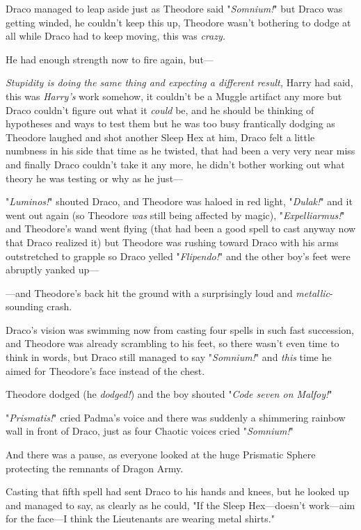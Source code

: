 Draco managed to leap aside just as Theodore said "\emph{Somnium!}" but Draco
was getting winded, he couldn't keep this up, Theodore wasn't bothering to
dodge at all while Draco had to keep moving, this was \emph{crazy.}

He had enough strength now to fire again, but—

\emph{Stupidity is doing the same thing and expecting a different result,}
Harry had said, this was \emph{Harry's} work somehow, it couldn't be a Muggle
artifact any more but Draco couldn't figure out what it \emph{could} be, and he
should be thinking of hypotheses and ways to test them but he was too busy
frantically dodging as Theodore laughed and shot another Sleep Hex at him,
Draco felt a little numbness in his side that time as he twisted, that had been
a very very near miss and finally Draco couldn't take it any more, he didn't
bother working out what theory he was testing or why as he just—

"\emph{Luminos!}" shouted Draco, and Theodore was haloed in red light,
"\emph{Dulak!}" and it went out again (so Theodore \emph{was} still being
affected by magic), "\emph{Expelliarmus!}" and Theodore's wand went flying
(that had been a good spell to cast anyway now that Draco realized it) but
Theodore was rushing toward Draco with his arms outstretched to grapple so
Draco yelled "\emph{Flipendo!}" and the other boy's feet were abruptly yanked
up—

—and Theodore's back hit the ground with a surprisingly loud and
\emph{metallic}-sounding crash.

Draco's vision was swimming now from casting four spells in such fast
succession, and Theodore was already scrambling to his feet, so there wasn't
even time to think in words, but Draco still managed to say "\emph{Somnium!}"
and \emph{this} time he aimed for Theodore's face instead of the chest.

Theodore dodged (he \emph{dodged!}) and the boy shouted "\emph{Code seven on
Malfoy!}"

"\emph{Prismatis!}" cried Padma's voice and there was suddenly a shimmering
rainbow wall in front of Draco, just as four Chaotic voices cried
"\emph{Somnium!}"

And there was a pause, as everyone looked at the huge Prismatic Sphere
protecting the remnants of Dragon Army.

Casting that fifth spell had sent Draco to his hands and knees, but he looked
up and managed to say, as clearly as he could, "If the Sleep Hex—doesn't
work—aim for the face—I think the Lieutenants are wearing metal shirts."

